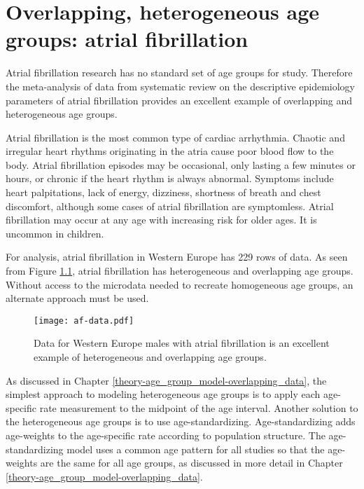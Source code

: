 \chapter{Overlapping, heterogeneous age groups: atrial fibrillation}
\label{applications-age_groups}

Atrial fibrillation research has no standard set of age groups for
study.  Therefore the meta-analysis of data from systematic review on
the descriptive epidemiology parameters of atrial fibrillation
provides an excellent example of overlapping and heterogeneous age
groups.

Atrial fibrillation is the most common type of cardiac arrhythmia.
Chaotic and irregular heart rhythms originating in the atria cause
poor blood flow to the body.  Atrial fibrillation episodes may be
occasional, only lasting a few minutes or hours, or chronic if the
heart rhythm is always abnormal.  Symptoms include heart palpitations,
lack of energy, dizziness, shortness of breath and chest discomfort,
although some cases of atrial fibrillation are symptomless.  Atrial
fibrillation may occur at any age with increasing risk for older ages.
It is uncommon in children. \cite{rich_epidemiology_2009,
  rho_asymptomatic_2005, fuster_acc/aha/esc_2006, radford_atrial_1977}

For analysis, atrial fibrillation in Western Europe has 229 rows of
data.  As seen from Figure \ref{fig:app-af data}, atrial fibrillation
has heterogeneous and overlapping age groups.  Without access to the
microdata needed to recreate homogeneous age groups, an alternate
approach must be used.

    \begin{figure}[h]
        \begin{center}
            \texttt{[image: af-data.pdf]}
            \caption{Data for Western Europe males with atrial
              fibrillation is an excellent example of heterogeneous
              and overlapping age groups.}
            \label{fig:app-af data}
        \end{center}
    \end{figure}

As discussed in Chapter \ref{theory-age_group_model-overlapping_data},
the simplest approach to modeling heterogeneous age groups is to apply
each age-specific rate measurement to the midpoint of the age interval.
Another solution to the heterogeneous age groups is to use age-standardizing.
Age-standardizing adds age-weights to the age-specific rate according
to population structure.  The age-standardizing model uses a common
age pattern for all studies so that the age-weights are the same for
all age groups, as discussed in more detail in Chapter
\ref{theory-age_group_model-overlapping_data}.


